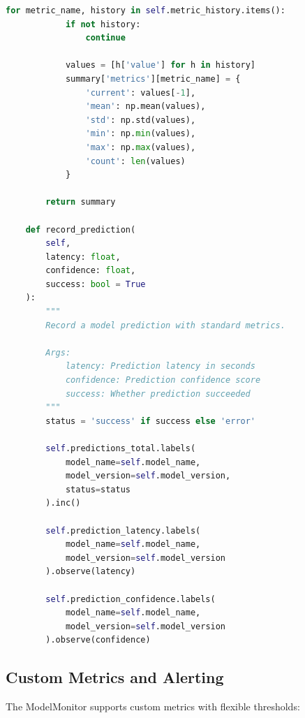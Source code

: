 \begin{lstlisting}[language=Python, caption={Comprehensive Model Performance Monitor}]
        for metric_name, history in self.metric_history.items():
            if not history:
                continue

            values = [h['value'] for h in history]
            summary['metrics'][metric_name] = {
                'current': values[-1],
                'mean': np.mean(values),
                'std': np.std(values),
                'min': np.min(values),
                'max': np.max(values),
                'count': len(values)
            }

        return summary

    def record_prediction(
        self,
        latency: float,
        confidence: float,
        success: bool = True
    ):
        """
        Record a model prediction with standard metrics.

        Args:
            latency: Prediction latency in seconds
            confidence: Prediction confidence score
            success: Whether prediction succeeded
        """
        status = 'success' if success else 'error'

        self.predictions_total.labels(
            model_name=self.model_name,
            model_version=self.model_version,
            status=status
        ).inc()

        self.prediction_latency.labels(
            model_name=self.model_name,
            model_version=self.model_version
        ).observe(latency)

        self.prediction_confidence.labels(
            model_name=self.model_name,
            model_version=self.model_version
        ).observe(confidence)
\end{lstlisting}

\subsection{Custom Metrics and Alerting}

The ModelMonitor supports custom metrics with flexible thresholds:

